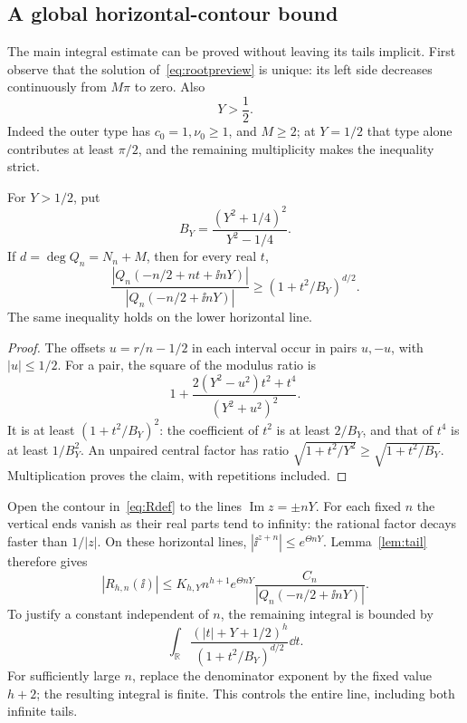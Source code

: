 \subsection{A global horizontal-contour bound}

The main integral estimate can be proved without leaving its tails
implicit. First observe that the solution of~\eqref{eq:rootpreview}
is unique: its left side decreases continuously from \(M\pi\) to
zero. Also
\begin{equation}\label{eq:Yhalf}
Y>\frac12.
\end{equation}
Indeed the outer type has \(c_0=1,\nu_0\ge1\), and \(M\ge2\);
at \(Y=1/2\) that type alone contributes at least \(\pi/2\), and
the remaining multiplicity makes the inequality strict.

\begin{lemma}\label{lem:tail}
For \(Y>1/2\), put
\[
B_Y=\frac{(Y^2+1/4)^2}{Y^2-1/4}.
\]
If \(d=\deg Q_n=N_n+M\), then for every real \(t\),
\begin{equation}\label{eq:tailineq}
\frac{|Q_n(-n/2+nt+\ii nY)|}
 {|Q_n(-n/2+\ii nY)|}
\ge (1+t^2/B_Y)^{d/2}.
\end{equation}
The same inequality holds on the lower horizontal line.
\end{lemma}
\begin{proof}
The offsets \(u=r/n-1/2\) in each interval occur in pairs \(u,-u\),
with \(|u|\le1/2\). For a pair, the square of the modulus ratio is
\[
1+\frac{2(Y^2-u^2)t^2+t^4}{(Y^2+u^2)^2}.
\]
It is at least \((1+t^2/B_Y)^2\): the coefficient of \(t^2\) is
at least \(2/B_Y\), and that of \(t^4\) is at least \(1/B_Y^2\).
An unpaired central factor has ratio
\(\sqrt{1+t^2/Y^2}\ge\sqrt{1+t^2/B_Y}\).
Multiplication proves the claim, with repetitions included.
\end{proof}

Open the contour in~\eqref{eq:Rdef} to the lines
\(\operatorname{Im}z=\pm nY\). For each fixed \(n\) the vertical
ends vanish as their real parts tend to infinity: the rational
factor decays faster than \(1/|z|\).
On these horizontal lines, \(|\ii^{z+n}|\le e^{\Theta nY}\).
Lemma~\ref{lem:tail} therefore gives
\begin{equation}\label{eq:Rcenter}
|R_{h,n}(\ii)|
\le K_{h,Y}n^{h+1}e^{\Theta nY}
\frac{C_n}{|Q_n(-n/2+\ii nY)|}.
\end{equation}
To justify a constant independent of \(n\), the remaining integral
is bounded by
\[
\int_{\mathbb R}
\frac{(|t|+Y+1/2)^h}{(1+t^2/B_Y)^{d/2}}\dd t.
\]
For sufficiently large \(n\), replace the denominator exponent
by the fixed value \(h+2\); the resulting integral is finite.
This controls the entire line, including both infinite tails.

